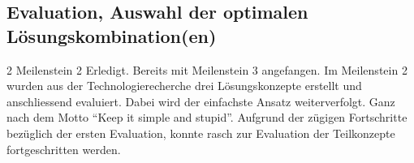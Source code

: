 
\subsection*{Evaluation, Auswahl der optimalen Lösungskombination(en)}
\workday
    {2}
    {\ok Meilenstein 2 Erledigt. Bereits mit Meilenstein 3 angefangen.}
    {
      Im Meilenstein 2 wurden aus der Technologierecherche drei Lösungskonzepte erstellt
      und anschliessend evaluiert. Dabei wird der einfachste Ansatz weiterverfolgt. 
      Ganz nach dem Motto ``Keep it simple and stupid''.
    }
    {
      Aufgrund der zügigen Fortschritte bezüglich der ersten Evaluation, konnte rasch zur Evaluation der Teilkonzepte fortgeschritten werden.
    }

